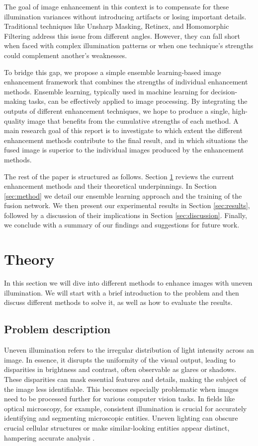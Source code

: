 \documentclass[sigconf]{acmart}
\begin{document}
The goal of image enhancement in this context is to compensate for these illumination variances without introducing artifacts or losing important details. Traditional techniques like Unsharp Masking, Retinex, and Homomorphic Filtering address this issue from different angles. However, they can fall short when faced with complex illumination patterns or when one technique's strengths could complement another's weaknesses.

To bridge this gap, we propose a simple ensemble learning-based image enhancement framework that combines the strengths of individual enhancement methods. Ensemble learning, typically used in machine learning for decision-making tasks, can be effectively applied to image processing. By integrating the outputs of different enhancement techniques, we hope to produce a single, high-quality image that benefits from the cumulative strengths of each method. A main research goal of this report is to investigate to which extent the different enhancement methods contribute to the final result, and in which situations the fused image is superior to the individual images produced by the enhancement methods.

The rest of the paper is structured as follows. Section \ref{sec:theory} reviews the current enhancement methods and their theoretical underpinnings. In Section \ref{sec:method} we detail our ensemble learning approach and the training of the fusion network. We then present our experimental results in Section \ref{sec:results}, followed by a discussion of their implications in Section \ref{sec:discussion}. Finally, we conclude with a summary of our findings and suggestions for future work.

\section{Theory}\label{sec:theory}
In this section we will dive into different methods to enhance images with uneven illumination. We will start with a brief introduction to the problem and then discuss different methods to solve it, as well as how to evaluate the results.

\subsection{Problem description}\label{sec:problem}
Uneven illumination refers to the irregular distribution of light intensity across an image. In essence, it disrupts the uniformity of the visual output, leading to disparities in brightness and contrast, often observable as glares or shadows. These disparities can mask essential features and details, making the subject of the image less identifiable. This becomes especially problematic when images need to be processed further for various computer vision tasks. In fields like optical microscopy, for example, consistent illumination is crucial for accurately identifying and segmenting microscopic entities. Uneven lighting can obscure crucial cellular structures or make similar-looking entities appear distinct, hampering accurate analysis \cite{dey2019uneven}.
\end{document}
